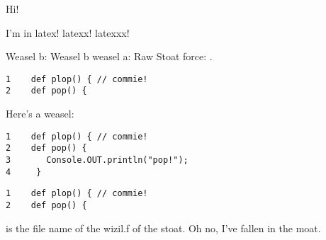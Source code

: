 Hi!

I'm in latex! latexx! latexxx!

Weasel b: 
Weasel b weasel a: 
Raw Stoat force: .





\begin{verbatim}
1    def plop() { // commie!
2    def pop() { 
\end{verbatim}

Here's a weasel:
\begin{verbatim}
1    def plop() { // commie!
2    def pop() { 
3       Console.OUT.println("pop!"); 
4     }
\end{verbatim}

\begin{verbatim}
1    def plop() { // commie!
2    def pop() { 
\end{verbatim}



 is the file name of the wizil.f   of
the stoat.  Oh no, I've fallen in the moat. 
